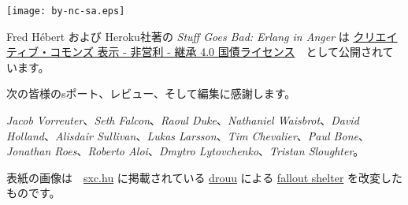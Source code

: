\clearpage
\thispagestyle{fancy}

\fancyhf{} %
\renewcommand{\headrulewidth}{0pt} %
\renewcommand{\footrulewidth}{0pt}

\vspace*{\fill}


\begin{center}
\texttt{[image: by-nc-sa.eps]}
\end{center}

\begin{center}
Fred Hébert および Heroku社著の \emph{Stuff Goes Bad: Erlang in Anger} は \href{http://creativecommons.org/licenses/by-nc-sa/4.0/}{クリエイティブ・コモンズ 表示 - 非営利 - 継承 4.0 国債ライセンス}　として公開されています。
\end{center}

次の皆様のsポート、レビュー、そして編集に感謝します。

\emph{Jacob Vorreuter}、\emph{Seth Falcon}、\emph{Raoul Duke}、\emph{Nathaniel Waisbrot}、\emph{David Holland}、\emph{Alisdair Sullivan}、\emph{Lukas Larsson}、\emph{Tim Chevalier}、\emph{Paul Bone}、\emph{Jonathan Roes}、\emph{Roberto Aloi}、\emph{Dmytro Lytovchenko}、\emph{Tristan Sloughter}。

\null
\vfill
表紙の画像は　\href{http://sxc.hu}{sxc.hu} に掲載されている \href{http://www.freeimages.com/profile/drouu}{drouu} による \href{http://www.freeimages.com/photo/533163}{fallout shelter} を改変したものです。


